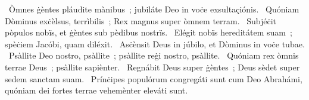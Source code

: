 \psalmChapterWithInscription{}
{ }
{%
~Òmnes ġèntes pláudite mànibus~; jubiláte Deo in voċe exsultaçiónis. 
~Quóniam Dòminus exċèlsus, terrìbilis~; Rex magnus super òmnem terram. 
~Subjéċit pòpulos nobïs, et ġèntes sub pèdibus nostrïs. 
~Elégit nobïs hereditátem suam~; spèċiem Jacóbi, quam diléxit. 
~Asċènsit Deus in júbilo, et Dòminus in voċe tubae. 
~Psàllite Deo nostro, psàllite~; psàllite reġi nostro, psàllite. 
~Quóniam rex òmnis terrae Deus~; psàllite sapiènter. 
~Regnábit Deus super ġèntes~; Deus sèdet super sedem sanctam suam. 
~Prínċipes populórum congregáti sunt cum Deo Abrahámi, quóniam dei fortes terrae vehemènter eleváti sunt. 
}

